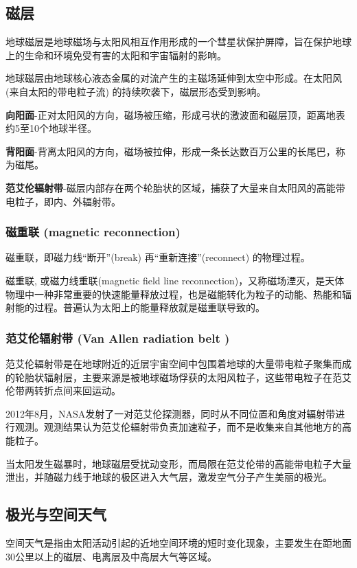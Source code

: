 \documentclass[12pt,a4paper]{article}
\begin{document}
	\subsection{磁层}
	地球磁层是地球磁场与太阳风相互作用形成的一个彗星状保护屏障，旨在保护地球上的生命和环境免受有害的太阳和宇宙辐射的影响。
	
	地球磁层由地球核心液态金属的对流产生的主磁场延伸到太空中形成。在太阳风 (来自太阳的带电粒子流) 的持续吹袭下，磁层形态受到影响。
	
	\textbf{向阳面}-正对太阳风的方向，磁场被压缩，形成弓状的激波面和磁层顶，距离地表约5至10个地球半径。
	
	\textbf{背阳面}-背离太阳风的方向，磁场被拉伸，形成一条长达数百万公里的长尾巴，称为磁尾。
	
	\textbf{范艾伦辐射带}-磁层内部存在两个轮胎状的区域，捕获了大量来自太阳风的高能带电粒子，即内、外辐射带。
	\subsubsection{磁重联 (magnetic reconnection)}
	
	磁重联，即磁力线“断开”(break) 再“重新连接”(reconnect) 的物理过程。
	
	磁重联, 或磁力线重联(magnetic field line reconnection)，又称磁场湮灭，是天体物理中一种非常重要的快速能量释放过程，也是磁能转化为粒子的动能、热能和辐射能的过程。普遍认为太阳上的能量释放就是磁重联导致的。
	\subsubsection{范艾伦辐射带 (Van Allen radiation belt )}
	范艾伦辐射带是在地球附近的近层宇宙空间中包围着地球的大量带电粒子聚集而成的轮胎状辐射层，主要来源是被地球磁场俘获的太阳风粒子，这些带电粒子在范艾伦带两转折点间来回运动。
	
	2012年8月，NASA发射了一对范艾伦探测器，同时从不同位置和角度对辐射带进行观测。观测结果认为范艾伦辐射带负责加速粒子，而不是收集来自其他地方的高能粒子。
	
	当太阳发生磁暴时，地球磁层受扰动变形，而局限在范艾伦带的高能带电粒子大量泄出，并随磁力线于地球的极区进入大气层，激发空气分子产生美丽的极光。
	
	\subsection{极光与空间天气}
	
	空间天气是指由太阳活动引起的近地空间环境的短时变化现象，主要发生在距地面30公里以上的磁层、电离层及中高层大气等区域。
	
\end{document}
